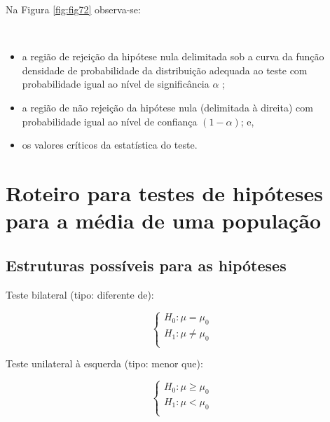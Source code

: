 \documentclass[
]{book}
\providecommand{\tightlist}{%
  \setlength{\itemsep}{0pt}\setlength{\parskip}{0pt}}
\begin{document}
\hfill\break

Na Figura \ref{fig:fig72} observa-se:

~

\begin{itemize}
\tightlist
\item
  a região de rejeição da hipótese nula delimitada sob a curva da função densidade de probabilidade da distribuição adequada ao teste com probabilidade igual ao nível de significância \(\alpha\) ;\\
\item
  a região de não rejeição da hipótese nula (delimitada à direita) com probabilidade igual ao nível de confiança \((1-\alpha)\); e,\\
\item
  os valores críticos da estatística do teste.
\end{itemize}

\hfill\break

\hypertarget{roteiro-para-testes-de-hipuxf3teses-para-a-muxe9dia-de-uma-populauxe7uxe3o}{%
\section{Roteiro para testes de hipóteses para a média de uma população}\label{roteiro-para-testes-de-hipuxf3teses-para-a-muxe9dia-de-uma-populauxe7uxe3o}}

\hypertarget{estruturas-possuxedveis-para-as-hipuxf3teses}{%
\subsection{Estruturas possíveis para as hipóteses}\label{estruturas-possuxedveis-para-as-hipuxf3teses}}

\hfill\break

Teste bilateral (tipo: diferente de):

\hfill\break

\[
\begin{cases}
    H_{0}: \mu = \mu_{0}\\
    H_{1}: \mu \ne \mu_{0}\\
\end{cases}
\]

\hfill\break

Teste unilateral à esquerda (tipo: menor que):

\hfill\break
\[
\begin{cases}
    H_{0}: \mu \ge \mu_{0}\\
    H_{1}: \mu < \mu_{0}\\
\end{cases}
\]\\
\end{document}
